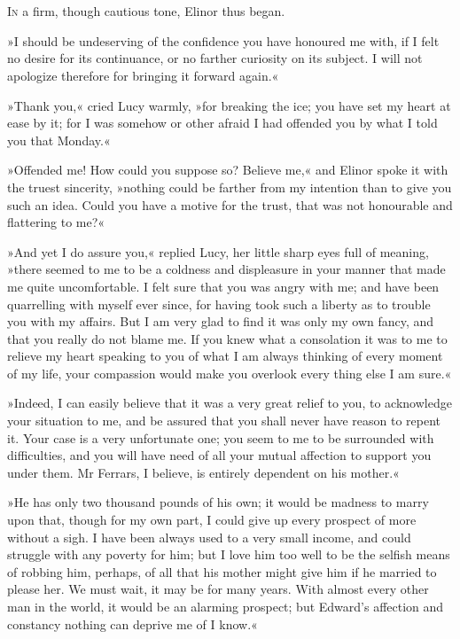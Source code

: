 \chapter[Chapter \thechapter]{}
\lettrine[lines=4,lraise=0.3]{I}{n} a firm, though cautious tone, Elinor thus began.

\zz
»I should be undeserving of the confidence you have honoured me with, if I felt no desire for its continuance, or no farther curiosity on its subject. I will not apologize therefore for bringing it forward again.«

»Thank you,« cried Lucy warmly, »for breaking the ice; you have set my heart at ease by it; for I was somehow or other afraid I had offended you by what I told you that Monday.«

»Offended me! How could you suppose so? Believe me,« and Elinor spoke it with the truest sincerity, »nothing could be farther from my intention than to give you such an idea. Could you have a motive for the trust, that was not honourable and flattering to me?«

»And yet I do assure you,« replied Lucy, her little sharp eyes full of meaning, »there seemed to me to be a coldness and displeasure in your manner that made me quite uncomfortable. I felt sure that you was angry with me; and have been quarrelling with myself ever since, for having took such a liberty as to trouble you with my affairs. But I am very glad to find it was only my own fancy, and that you really do not blame me. If you knew what a consolation it was to me to relieve my heart speaking to you of what I am always thinking of every moment of my life, your compassion would make you overlook every thing else I am sure.«

»Indeed, I can easily believe that it was a very great relief to you, to acknowledge your situation to me, and be assured that you shall never have reason to repent it. Your case is a very unfortunate one; you seem to me to be surrounded with difficulties, and you will have need of all your mutual affection to support you under them. Mr Ferrars, I believe, is entirely dependent on his mother.«

»He has only two thousand pounds of his own; it would be madness to marry upon that, though for my own part, I could give up every prospect of more without a sigh. I have been always used to a very small income, and could struggle with any poverty for him; but I love him too well to be the selfish means of robbing him, perhaps, of all that his mother might give him if he married to please her. We must wait, it may be for many years. With almost every other man in the world, it would be an alarming prospect; but Edward’s affection and constancy nothing can deprive me of I know.«

